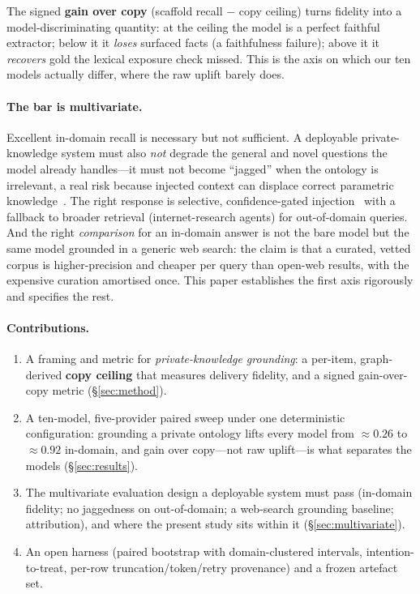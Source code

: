 \documentclass[11pt]{article}
\begin{document}
The signed \textbf{gain over copy} (scaffold recall $-$ copy ceiling) turns fidelity into a
model-discriminating quantity: at the ceiling the model is a perfect faithful extractor; below it
it \emph{loses} surfaced facts (a faithfulness failure); above it it \emph{recovers} gold the
lexical exposure check missed. This is the axis on which our ten models actually differ, where the
raw uplift barely does.

\paragraph{The bar is multivariate.} Excellent in-domain recall is necessary but not sufficient.
A deployable private-knowledge system must also \emph{not} degrade the general and novel questions
the model already handles---it must not become ``jagged'' when the ontology is irrelevant, a real
risk because injected context can displace correct parametric
knowledge~\cite{shi2023distracted,yoran2024robust,longpre2021entity}. The right response is
selective, confidence-gated injection~\cite{mallen2023trust} with a fallback to broader
retrieval (internet-research agents) for out-of-domain queries. And the right \emph{comparison}
for an in-domain answer is not the bare model but the same model grounded in a generic web
search: the claim is that a curated, vetted corpus is higher-precision and cheaper per query
than open-web results, with the expensive curation amortised once. This paper establishes the
first axis rigorously and specifies the rest.

\paragraph{Contributions.}
\begin{enumerate}[topsep=2pt,itemsep=1pt]
\item A framing and metric for \emph{private-knowledge grounding}: a per-item, graph-derived
\textbf{copy ceiling} that measures delivery fidelity, and a signed gain-over-copy metric
(\S\ref{sec:method}).
\item A ten-model, five-provider paired sweep under one deterministic configuration: grounding a
private ontology lifts every model from $\approx0.26$ to $\approx0.92$ in-domain, and gain over
copy---not raw uplift---is what separates the models (\S\ref{sec:results}).
\item The multivariate evaluation design a deployable system must pass (in-domain fidelity;
no jaggedness on out-of-domain; a web-search grounding baseline; attribution), and where the
present study sits within it (\S\ref{sec:multivariate}).
\item An open harness (paired bootstrap with domain-clustered intervals,
intention-to-treat, per-row truncation/token/retry provenance) and a frozen artefact set.
\end{enumerate}
\end{document}
